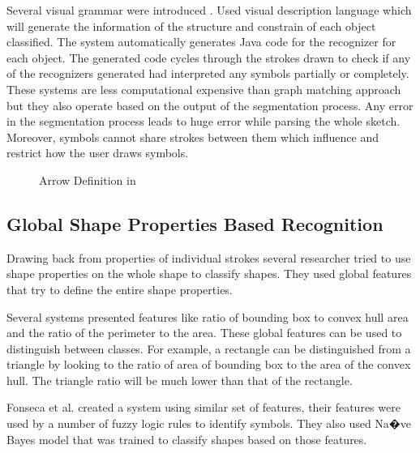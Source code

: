  Several visual grammar were introduced \cite{statisticalparsing26,Ladder30,GenericHMM28}. \cite{Ladder30,GenericHMM28}  Used visual description language which will generate the information of the structure and constrain of each object classified. The system automatically generates Java code for the recognizer for each object. The generated code cycles through the strokes drawn to check if any of the recognizers generated had interpreted any symbols partially or completely.  These systems are less computational expensive than graph matching approach but they also operate based on the output of the segmentation process. Any error in the segmentation process leads to huge error while parsing the whole sketch. Moreover, symbols cannot share strokes between them which influence and restrict how the user draws symbols. 
\begin{figure}
	\centering
			\hfill
	\caption[Arrow Definition]{Arrow Definition in \cite{Ladder30}}
		\label{fig:arrowladderdef1}
\end{figure}
 
\subsection{Global Shape Properties Based Recognition}
\label{sec:GlobalFeaturesBasedRecognition}

Drawing back from properties of individual strokes several researcher tried to use shape properties on the whole shape to classify shapes. They used global features that try to define the entire shape properties. 

 Several systems \cite{DiagramOfflineConvexHull,MulitStrokeConvexHull} presented features like ratio of bounding box to convex hull area and the ratio of the perimeter to the area.  These global features can be used to distinguish between classes. For example, a rectangle can be distinguished from a triangle by looking to the ratio of area of bounding box to the area of the convex hull. The triangle ratio will be much lower than that of the rectangle. 
 
 Fonseca et al.\cite{Cali63} created a system using similar set of features, their features were used by a number of fuzzy logic rules to identify symbols. They also used Na�ve Bayes model that was trained to classify shapes based on those features. 
 
